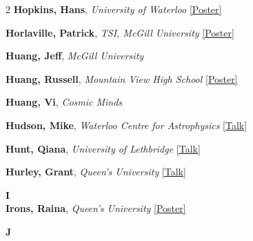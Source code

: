 \begin{small}
\begin{multicols}{2}
\textbf{Hopkins, Hans}, {\footnotesize\textit{University of Waterloo}} \hyperref[poster-abstract-page-talk-40]{\scriptsize\textcolor{cascateal}{[Poster]}}\par
\textbf{Horlaville, Patrick}, {\footnotesize\textit{TSI, McGill University}} \hyperref[poster-abstract-page-talk-320]{\scriptsize\textcolor{cascateal}{[Poster]}}\par
\textbf{Huang, Jeff}, {\footnotesize\textit{McGill University}}\par
\textbf{Huang, Russell}, {\footnotesize\textit{Mountain View High School}} \hyperref[poster-abstract-page-talk-30]{\scriptsize\textcolor{cascateal}{[Poster]}}\par
\textbf{Huang, Vi}, {\footnotesize\textit{Cosmic Minds}}\par
\textbf{Hudson, Mike}, {\footnotesize\textit{Waterloo Centre for Astrophysics}} \hyperref[abstract-page-talk-176]{\scriptsize\textcolor{cascablue}{[Talk]}}\par
\textbf{Hunt, Qiana}, {\footnotesize\textit{University of Lethbridge}} \hyperref[abstract-page-talk-117]{\scriptsize\textcolor{cascablue}{[Talk]}}\par
\textbf{Hurley, Grant}, {\footnotesize\textit{Queen's University}} \hyperref[abstract-page-talk-180]{\scriptsize\textcolor{cascablue}{[Talk]}}\par

{\sffamily\bfseries\color{cascablue}\large I}\\[2pt]

\textbf{Irons, Raina}, {\footnotesize\textit{Queen's University}} \hyperref[poster-abstract-page-talk-331]{\scriptsize\textcolor{cascateal}{[Poster]}}\par

{\sffamily\bfseries\color{cascablue}\large J}\\[2pt]


\end{multicols}
\end{small}
